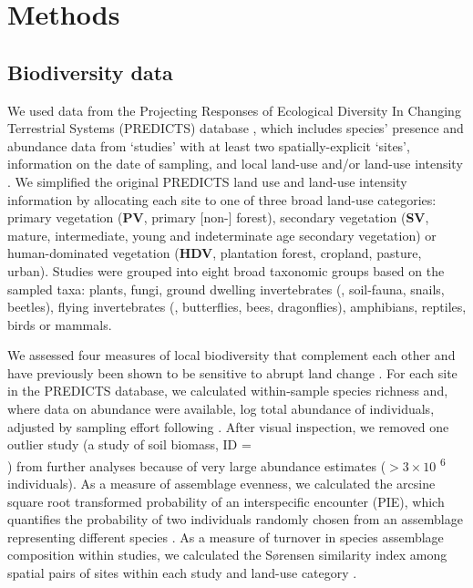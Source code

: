 \section{Methods}
\label{C03_02}
\subsection{Biodiversity data} 
\label{C03_0201}
We used data from the Projecting Responses of Ecological Diversity In Changing Terrestrial Systems (PREDICTS) database \citep{Hudson2016}, which includes species’ presence and abundance data from ‘studies’ with at least two spatially-explicit ‘sites’, information on the date of sampling, and local land-use and/or land-use intensity \citep{Hudson2016}. We simplified the original PREDICTS land use and land-use intensity information \citep{Hudson2014,Hudson2016} by allocating each site to one of three broad land-use categories: primary vegetation (\textbf{PV}, \ie primary [non-] forest), secondary vegetation (\textbf{SV}, \ie mature, intermediate, young and indeterminate age secondary vegetation) or human-dominated vegetation (\textbf{HDV}, \ie plantation forest, cropland, pasture, urban). Studies were grouped into eight broad taxonomic groups based on the sampled taxa: plants, fungi, ground dwelling invertebrates (\eg, soil-fauna, snails, beetles), flying invertebrates (\eg, butterflies, bees, dragonflies), amphibians, reptiles, birds or mammals. 

We assessed four measures of local biodiversity that complement each other and have previously been shown to be sensitive to abrupt land change \citep{Supp2014,Santini2016}. For each site in the PREDICTS database, we calculated within-sample species richness and, where data on abundance were available, log total abundance of individuals, adjusted by sampling effort following \cite{Newbold2014b}. After visual inspection, we removed one outlier study (a study of soil biomass, ID = \\ ) from further analyses because of very large abundance estimates ($> 3\times 10$ \textsuperscript{6} individuals). As a measure of assemblage evenness, we calculated the arcsine square root transformed probability of an interspecific encounter (PIE), which quantifies the probability of two individuals randomly chosen from an assemblage representing different species \citep{Hurlbert1971}. As a measure of turnover in species assemblage composition within studies, we calculated the S\o rensen similarity index among spatial pairs of sites within each study and land-use category \citep{Magurran2004}.


